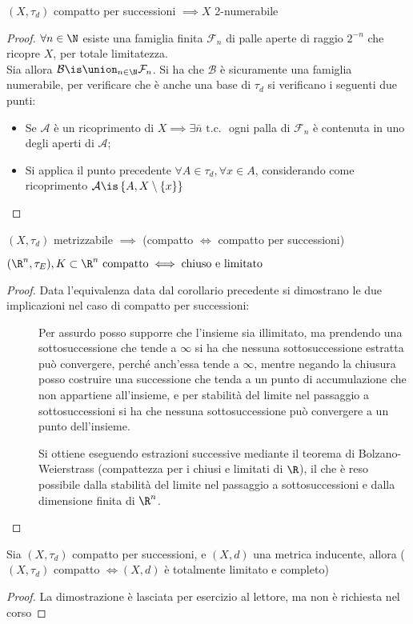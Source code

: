 \begin{prop}
$(X, \tau _d)$ compatto per successioni $\implies X$ 2-numerabile
\end{prop}
\begin{proof}
$\forall n \in \N$ esiste una famiglia finita $\mathcal{F}_n$ di palle aperte di raggio $2^{-n}$ che ricopre $X$, per totale limitatezza.\\
Sia allora $\mathcal{B} \is \union _{n \in \N} \mathcal F_n$. Si ha che $\mathcal{B}$ è sicuramente una famiglia numerabile, per verificare che è anche una base di $\tau _d$ si verificano i seguenti due punti:
\begin{itemize}
\item Se $\mathcal{A}$ è un ricoprimento di $X \implies \exists \bar{n} \text{ t.c. }$ ogni palla di $\mathcal{F}_n$ è contenuta in uno degli aperti di $\mathcal{A}$;
\item Si applica il punto precedente $\forall A \in \tau _d , \forall x \in A$, considerando come ricoprimento $\mathcal{A} \is \left\{ {A, X\setminus \left\{ {x}\right\}}\right\}$
\end{itemize}
\end{proof}

\begin{cor}
$(X,\tau _d)$ metrizzabile $\implies$ (compatto $\iff$ compatto per successioni)
\end{cor}

\begin{prop}
$(\R^n, \tau _E), K\subset \R^n\text{ compatto} \iff\text{chiuso e limitato}$
\end{prop}
\begin{proof}
	Data l'equivalenza data dal corollario precedente si dimostrano le due implicazioni nel caso di compatto per successioni:
	\begin{description}
		\item[\proofrightarrow]
		Per assurdo posso supporre che l'insieme sia illimitato, ma prendendo una sottosuccessione che tende a $\infty$ si ha che nessuna sottosuccessione estratta può convergere, perché anch'essa tende a $\infty$, mentre negando la chiusura posso costruire una successione che tenda a un punto di accumulazione che non appartiene all'insieme, e per stabilità del limite nel passaggio a sottosuccessioni si ha che nessuna sottosuccessione può convergere a un punto dell'insieme.
		\item[\proofleftarrow]
		Si ottiene eseguendo estrazioni successive mediante il teorema di Bolzano-Weierstrass (compattezza per i chiusi e limitati di $\R$), il che è reso possibile dalla stabilità del limite nel passaggio a sottosuccessioni e dalla dimensione finita di $\R^n$.
	\end{description}
\end{proof}

\begin{teo}
Sia $(X,\tau _d)$ compatto per successioni, e $(X,d)$ una metrica inducente, allora ($(X,\tau _d)$ compatto $\iff (X,d)$ è totalmente limitato e completo)
\end{teo}
\begin{proof}
La dimostrazione è lasciata per esercizio al lettore, ma non è richiesta nel corso
\end{proof}
